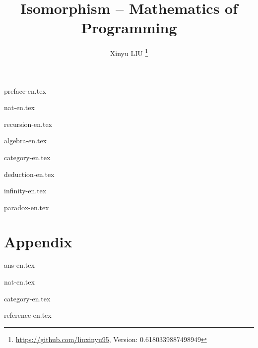 \documentclass[b5paper, twoside, table]{book}
\begin{document}



\title{
  {\bf \Huge Isomorphism \newline}
  \vspace{5mm}
  {\bf -- Mathematics of Programming \newline \newline \newline}
  \centering
}

\author{Xinyu LIU
  \thanks{ \url{https://github.com/liuxinyu95}, Version: 0.6180339887498949}
}

\maketitle

\frontmatter
{preface-en.tex}
\newpage

\tableofcontents

\mainmatter

{nat-en.tex}

{recursion-en.tex}

{algebra-en.tex}

{category-en.tex}

{deduction-en.tex}

{infinity-en.tex}

{paradox-en.tex}

\part*{Appendix}
\appendix
\noappendicestocpagenum
\addappheadtotoc

\backmatter
{ans-en.tex}

{nat-en.tex}

{category-en.tex}

{reference-en.tex}

\printindex


\end{document}
